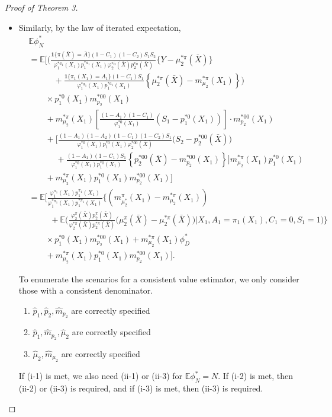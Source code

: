 \documentclass{article}
\newcommand{\wh}{\widehat}
\newcommand{\pk}{{\varphi}}
\begin{document}
\begin{proof}[Proof of Theorem 3]
\begin{itemize}
	
	\item[(ii)]
	Similarly, by the law of iterated expectation,
	\begin{align}
		&\mathbb E\phi_N^* \\
		&= \mathbb E \bigg[
		\bigg( \frac{\mathbf1\{\pi(\bar X)=\bar A\}(1-C_1)(1-C_2)S_1S_2}{\pk^{*a_1}_1(X_1)p_1^{*a_1}(X_1)\pk_2^{*\bar a}(\bar X)p_2^{*\bar a}(\bar X)} \big\{Y - \mu_2^{*\pi}(\bar X)\big\} \\
		  &\qquad\quad+ \frac{\mathbf1\{\pi_1(X_1)=A_1\}(1-C_1)S_1}{\pk_1^{*a_1}(X_1)p_1^{*a_1}(X_1)} \left\{ \mu_2^{*\pi}(\bar X)  
		    - m_{\mu_2}^{*\pi}(X_1) \right\} \bigg) \\
		  &\qquad \times p_1^{*0}(X_1) m_{p_2}^{*00}(X_1) \\
		  &\qquad+ m_{\mu_2}^{*\pi}(X_1) \left[ \frac{(1-A_1)(1-C_1)}{\pk_1^{*0}(X_1)} \left(S_1 - p_1^{*0}(X_1)\right) \right] \cdot m_{p_2}^{*00}(X_1) \\
		  &\qquad+ \bigg[ \frac{(1-A_1)(1-A_2)(1-C_1)(1-C_2)S_1}{\pk_1^{*0}(X_1)p_1^{*0}(X_1)\pk_2^{*00}(\bar X)} \big(S_2 - p_2^{*00}(\bar X)\big) \\
	  	  &\qquad\quad\;+ 
	  	     \frac{(1-A_1)(1-C_1)S_1}{\pk_1^{*0}(X_1)p_1^{*0}(X_1)} \left\{ p_2^{*00}(\bar X) - m_{p_2}^{*00}(X_1) \right\} \bigg] m_{\mu_2}^{*\pi}(X_1) p_1^{*0}(X_1) \\
		  &\qquad+ m_{\mu_2}^{*\pi}(X_1) p_1^{*0}(X_1) m_{p_2}^{*00}(X_1)  \bigg] \\
		&= \mathbb E\Bigg[ 
		  \frac{\pk_1^{\pi_1}(X_1)p_1^{\pi_1}(X_1)}{\pk_1^{*\pi_1}(X_1)p_1^{*\pi_1}(X_1)} 
		    \bigg\{
		  \left( m_{\mu^*_2}^{\pi}(X_1) - m_{\mu_2}^{*\pi}(X_1) \right)
		      \\
		  &\qquad\;\;+ 
		    \mathbb E\bigg( 
		    \frac{\pk_2^{\pi}(\bar X)p_2^{\pi}(\bar X)}{\pk_2^{*\pi}(\bar X)p_2^{*\pi}(\bar X)}
		    \big(\mu_2^{\pi}(\bar X) - \mu_2^{*\pi}(\bar X)\big) 
		  \Big\vert X_1,A_1=\pi_1(X_1),C_1=0,S_1=1\bigg)
		      \bigg\} \\
		  &\qquad\times p_1^{*0}(X_1) m_{p_2}^{*00}(X_1) 
		    + m_{\mu_2}^{*\pi}(X_1) \phi_D^* \\
		  &\qquad+ 
		    m_{\mu_2}^{*\pi}(X_1) p_1^{*0}(X_1) m_{p_2}^{*00}(X_1)
		  \Bigg].  
	\end{align}
	
	To enumerate the scenarios for a consistent value estimator, we only consider those with a consistent denominator.
	\begin{enumerate}
		\item[(ii-1)]  $\wh p_1, \wh p_2, \wh m_{p_2}$ are correctly specified
		\item[(ii-2)]  $\wh p_1, \wh m_{p_2}, \wh\mu_2$ are correctly specified
		\item[(ii-3)]  $\wh\mu_2, \wh m_{\mu_2}$ are correctly specified
	\end{enumerate}
	If (i-1) is met, we also need (ii-1) or (ii-3) for $\mathbb E\phi_N^* = N$. If (i-2) is met, then (ii-2) or (ii-3) is required, and if (i-3) is met, then (ii-3) is required.
\end{itemize}


\end{proof}
\end{document}
